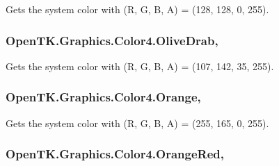 Gets the system color with (R, G, B, A) = (128, 128, 0, 255). 

\hypertarget{struct_open_t_k_1_1_graphics_1_1_color4_a72ea3d25e2ba4f10075ba3a55b550db2}{
\subsubsection[{Olive\-Drab}]{ Open\-T\-K.\-Graphics.\-Color4.\-Olive\-Drab\hspace{0.3cm}{\ttfamily [static]}, {\ttfamily [get]}}}\label{struct_open_t_k_1_1_graphics_1_1_color4_a72ea3d25e2ba4f10075ba3a55b550db2}


Gets the system color with (R, G, B, A) = (107, 142, 35, 255). 

\hypertarget{struct_open_t_k_1_1_graphics_1_1_color4_a0500d32ad9ec576ab7d4c48860851650}{
\subsubsection[{Orange}]{ Open\-T\-K.\-Graphics.\-Color4.\-Orange\hspace{0.3cm}{\ttfamily [static]}, {\ttfamily [get]}}}\label{struct_open_t_k_1_1_graphics_1_1_color4_a0500d32ad9ec576ab7d4c48860851650}


Gets the system color with (R, G, B, A) = (255, 165, 0, 255). 

\hypertarget{struct_open_t_k_1_1_graphics_1_1_color4_afc067480eff6b4b770c1415dfb5122d6}{
\subsubsection[{Orange\-Red}]{ Open\-T\-K.\-Graphics.\-Color4.\-Orange\-Red\hspace{0.3cm}{\ttfamily [static]}, {\ttfamily [get]}}}\label{struct_open_t_k_1_1_graphics_1_1_color4_afc067480eff6b4b770c1415dfb5122d6}


